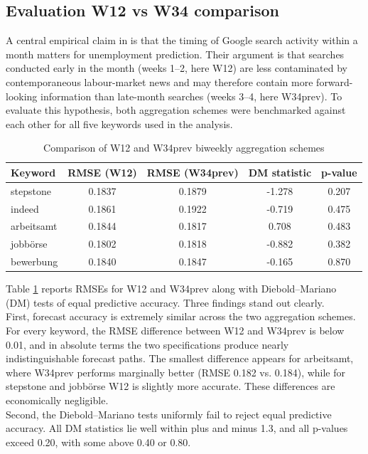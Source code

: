 \documentclass[12pt,a4paper]{article}
\begin{document}
\subsection{Evaluation W12 vs W34 comparison}
A central empirical claim in \citet{Askitas} is that the timing of Google search activity within a month matters for unemployment prediction. Their argument is that searches conducted early in the month (weeks 1–2, here W12) are less contaminated by contemporaneous labour-market news and may therefore contain more forward-looking information than late-month searches (weeks 3–4, here W34prev).
To evaluate this hypothesis, both aggregation schemes were benchmarked against each other for all five keywords used in the analysis.
\begin{table}[ht!]
\centering
\caption{Comparison of W12 and W34prev biweekly aggregation schemes}
\label{tab:w12_w34_comparison}
\begin{tabular}{lcccc}
\toprule
\textbf{Keyword} & \textbf{RMSE (W12)} & \textbf{RMSE (W34prev)} & \textbf{DM statistic} & \textbf{p-value} \\
\midrule
stepstone   & 0.1837 & 0.1879 &  -1.278 & 0.207 \\
indeed      & 0.1861 & 0.1922 &  -0.719 & 0.475 \\
arbeitsamt  & 0.1844 & 0.1817 &   0.708 & 0.483 \\
jobbörse    & 0.1802 & 0.1818 &  -0.882 & 0.382 \\
bewerbung   & 0.1840 & 0.1847 &  -0.165 & 0.870 \\
\bottomrule
\end{tabular}
\end{table}
Table \ref{tab:w12_w34_comparison} reports RMSEs for W12 and W34prev along with Diebold–Mariano (DM) tests of equal predictive accuracy. Three findings stand out clearly.\\
First, forecast accuracy is extremely similar across the two aggregation schemes.
For every keyword, the RMSE difference between W12 and W34prev is below 0.01, and in absolute terms the two specifications produce nearly indistinguishable forecast paths.
The smallest difference appears for arbeitsamt, where W34prev performs marginally better (RMSE 0.182 vs. 0.184), while for stepstone and jobbörse W12 is slightly more accurate. These differences are economically negligible.\\
Second, the Diebold–Mariano tests uniformly fail to reject equal predictive accuracy.
All DM statistics lie well within plus and minus 1.3, and all p-values exceed 0.20, with some above 0.40 or 0.80.
\end{document}
